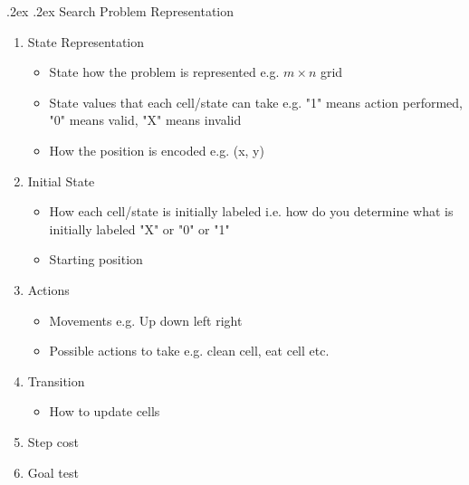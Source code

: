 \documentclass[10pt,landscape,a4paper]{article}
\makeatletter
\renewcommand{\section}{\@startsection{section}{1}{0mm}%
	{.2ex}%
	{.2ex}%
	{\color{myblue}\sffamily\small\bfseries}}
\makeatother
\begin{document}
\begin{multicols*}{4}
  \section{Search Problem Representation}
  \begin{enumerate}
  	\item State Representation
  	\begin{itemize}
  		\item State how the problem is represented e.g. $m\times n$ grid
  		\item State values that each cell/state can take e.g. "1" means action performed, "0" means valid, "X" means invalid
  		\item How the position is encoded e.g. (x, y)
  	\end{itemize}
  	\item Initial State
  	\begin{itemize}
  		\item How each cell/state is initially labeled i.e. how do you determine what is initially labeled "X" or "0" or "1"
  		\item Starting position
  	\end{itemize}
  	\item Actions
  	\begin{itemize}
  		\item Movements e.g. Up down left right
  		\item Possible actions to take e.g. clean cell, eat cell etc.
  	\end{itemize}
  	\item Transition
  	\begin{itemize}
  		\item How to update cells
  	\end{itemize}
  	\item Step cost
  	\item Goal test
  \end{enumerate}

\end{multicols*}
\end{document}
